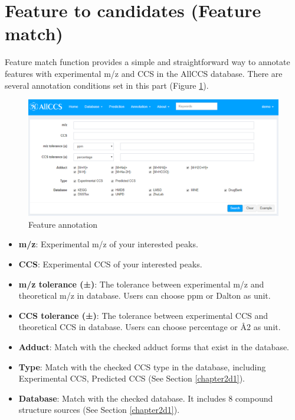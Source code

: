 \documentclass[12pt,]{book}
\providecommand{\tightlist}{%
  \setlength{\itemsep}{0pt}\setlength{\parskip}{0pt}}
\begin{document}
\section{Feature to candidates (Feature match)}\label{chapter4d1}

Feature match function provides a simple and straightforward way to
annotate features with experimental m/z and CCS in the AllCCS database.
There are several annotation conditions set in this part (Figure
\ref{fig:figure4d1}).

\begin{figure}

{\centering \includegraphics{images/chapter4/figure4.1} 

}

\caption{Feature annotation}\label{fig:figure4d1}
\end{figure}

\begin{itemize}
\tightlist
\item
  \textbf{m/z}: Experimental m/z of your interested peaks.
\item
  \textbf{CCS}: Experimental CCS of your interested peaks.
\item
  \textbf{m/z tolerance (±)}: The tolerance between experimental m/z and
  theoretical m/z in database. Users can choose ppm or Dalton as unit.
\item
  \textbf{CCS tolerance (±)}: The tolerance between experimental CCS and
  theoretical CCS in database. Users can choose percentage or Å2 as
  unit.
\item
  \textbf{Adduct}: Match with the checked adduct forms that exist in the
  database.
\item
  \textbf{Type}: Match with the checked CCS type in the database,
  including Experimental CCS, Predicted CCS (See Section
  \ref{chapter2d1}).
\item
  \textbf{Database}: Match with the checked database. It includes 8
  compound structure sources (See Section \ref{chapter2d1}).
\end{itemize}
\end{document}
